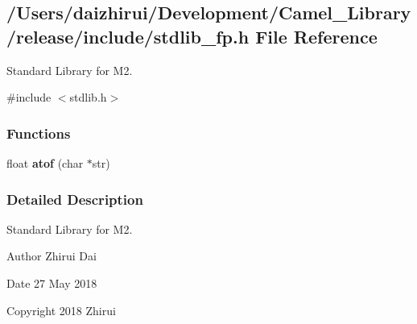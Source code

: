 \hypertarget{a00035}{}\subsection{/\+Users/daizhirui/\+Development/\+Camel\+\_\+\+Library/release/include/stdlib\+\_\+fp.h File Reference}
\label{a00035}


Standard Library for M2.  


{\ttfamily \#include $<$stdlib.\+h$>$}\newline
\subsubsection*{Functions}
\begin{DoxyCompactItemize}
\item 
\mbox{\label{a00035_a40bb24dc7d4d98600cd976323cea17e0}} 
float {\bfseries atof} (char $\ast$str)
\end{DoxyCompactItemize}


\subsubsection{Detailed Description}
Standard Library for M2. 

\begin{DoxyAuthor}{Author}
Zhirui Dai 
\end{DoxyAuthor}
\begin{DoxyDate}{Date}
27 May 2018 
\end{DoxyDate}
\begin{DoxyCopyright}{Copyright}
2018 Zhirui 
\end{DoxyCopyright}
